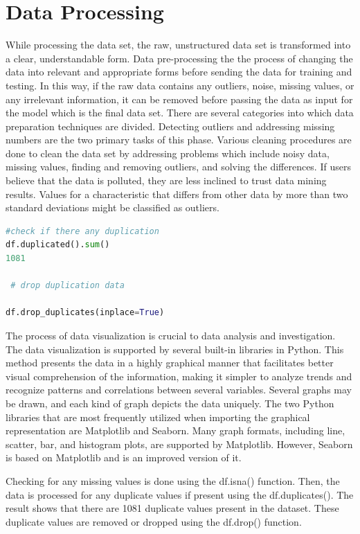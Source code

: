 \section{Data Processing}
While processing the data set, the raw, unstructured data set is transformed into a clear, understandable form. Data pre-processing the the process of changing the data into relevant and appropriate forms before sending the data for training and testing. In this way, if the raw data contains any outliers, noise, missing values, or any irrelevant information, it can be removed before passing the data as input for the model which is the final data set. There are several  categories into which data preparation techniques are divided. Detecting outliers and addressing missing numbers are the two primary tasks of this phase. Various cleaning procedures are done to clean the data set by addressing problems which include noisy data, missing values, finding and removing outliers, and solving the differences. If users believe that the data is polluted, they are less inclined to trust data mining results. Values for a characteristic that differs from other data by more than two standard deviations might be classified as outliers. 
\begin{lstlisting}[language=Python, caption={Creating and training Catboost model}, label=list:python_code_ex]
#check if there any duplication
df.duplicated().sum()
1081

 # drop duplication data

df.drop_duplicates(inplace=True)
\end{lstlisting}

The process of data visualization is crucial to data analysis and investigation. The data visualization is supported by several built-in libraries in Python. This method presents the data in a highly graphical manner that facilitates better visual comprehension of the information, making it simpler to analyze trends and recognize patterns and correlations between several variables. Several graphs may be drawn, and each kind of graph depicts the data uniquely. The two Python libraries that are most frequently utilized when importing the graphical representation are Matplotlib and Seaborn. Many graph formats, including line, scatter, bar, and histogram plots, are supported by Matplotlib. However, Seaborn is based on Matplotlib and is an improved version of it. 

Checking for any missing values is done using the df.isna() function. Then, the data is processed for any duplicate values if present using the df.duplicates(). The result shows that there are 1081 duplicate values present in the dataset. These duplicate values are removed or dropped using the df.drop() function.

